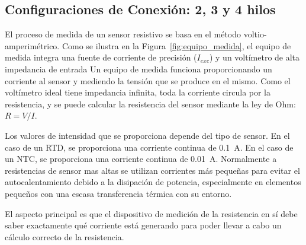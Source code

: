 


\subsection{Configuraciones de Conexión: 2, 3 y 4 hilos}\label{sec:conexion_hilos}

El proceso de medida de un sensor resistivo se basa en el método voltio-amperimétrico. Como se ilustra en la Figura~\ref{fig:equipo_medida}, el equipo de medida integra una fuente de corriente de precisión ($I_{exc}$) y un voltímetro de alta impedancia de entrada Un equipo de medida funciona proporcionando un corriente al sensor y mediendo la tensión que se produce en el mismo. Como el voltímetro ideal tiene impedancia infinita, toda la corriente circula por la resistencia, y se puede calcular la resistencia del sensor mediante la ley de Ohm: $R = V / I$.

Los valores de intensidad que se proporciona depende del tipo de sensor. En el caso de un RTD, se proporciona una corriente continua de \qty{0,1}{A}. En el caso de un NTC, se proporciona una corriente continua de \qty{0,01}{A}. Normalmente a resistencias de sensor mas altas se utilizan corrientes más pequeñas para evitar el autocalentamiento debido a la disipación de potencia, especialmente en elementos pequeños con una escasa transferencia térmica con su entorno. 

El aspecto principal es que el dispositivo de medición de la resistencia en sí debe saber exactamente qué corriente está generando para poder llevar a cabo un cálculo correcto de la resistencia.

